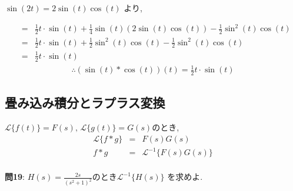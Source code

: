 ﻿\documentclass[a4j]{jarticle}
\begin{document}
\( \sin(2t) = 2\sin(t)\cos(t) \) より,

\begin{eqnarray*}
         &=& \frac{1}{2}t\cdot\sin(t) + \frac{1}{4}\sin(t)(2\sin(t)\cos(t)) - \frac{1}{2}\sin^2(t)\cos(t) \\
         &=& \frac{1}{2}t\cdot\sin(t) + \frac{1}{2}\sin^2(t)\cos(t) - \frac{1}{2}\sin^2(t)\cos(t) \\
         &=& \frac{1}{2}t\cdot\sin(t)
\end{eqnarray*}
\begin{eqnarray*}
\therefore (\sin(t) * \cos(t))(t) = \frac{1}{2}t\cdot\sin(t)
\end{eqnarray*}

\subsection{畳み込み積分とラプラス変換}

\( \mathcal{L} \{ f(t) \} = F(s) ,\, \mathcal{L} \{ g(t) \} = G(s) \)のとき,
\begin{eqnarray*}
\mathcal{L} \{ f * g \} &=& F(s)G(s) \\
                  f * g &=& \mathcal{L}^{-1} \{ F(s)G(s) \} \\
\end{eqnarray*}

\noindent
{\large {\bf 問19}}: \( H(s) = \frac{2s}{(s^2+1)^2} \text{のとき} \mathcal{L}^{-1} \{ H(s) \} \) を求めよ.
\end{document}
